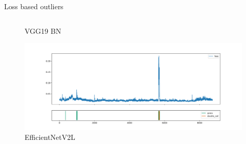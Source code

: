 \documentclass[aspectratio=169]{beamer}
\begin{document}
\begin{frame}{Loss based outliers}
\begin{columns}
\begin{column}{0.45\textwidth}
\begin{figure}
                \caption*{VGG19 BN}
                \includegraphics[width=\columnwidth,trim={0 0 0 1cm},clip]{./results/efficientnetv2l_vgg19/20230525_194238_feature_vectors_loss.png}
                \caption*{EfficientNetV2L}
            \end{figure}
        \end{column}
    \end{columns}
\end{frame}
\end{document}
